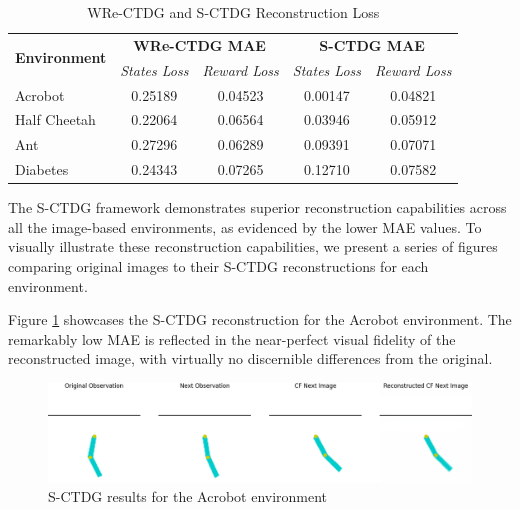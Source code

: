 \begin{table}[h]
    \centering
    \begin{tabular}{@{}lcccc@{}}
    \toprule
    \multicolumn{1}{c}{\multirow{2}{*}{\textbf{Environment}}} & \multicolumn{2}{c}{\textbf{WRe-CTDG MAE}}   & \multicolumn{2}{c}{\textbf{S-CTDG MAE}}     \\ \cmidrule(l){2-5} 
    \multicolumn{1}{c}{}                                      & \textit{States Loss} & \textit{Reward Loss} & \textit{States Loss} & \textit{Reward Loss} \\ \midrule
    Acrobot                                                   & 0.25189              & 0.04523              & 0.00147              & 0.04821              \\
    Half Cheetah                                              & 0.22064              & 0.06564              & 0.03946              & 0.05912              \\
    Ant                                                       & 0.27296              & 0.06289              & 0.09391              & 0.07071              \\
    Diabetes                                                  & 0.24343              & 0.07265              & 0.12710              & 0.07582              \\ \bottomrule
    \end{tabular}
    \caption{WRe-CTDG and S-CTDG Reconstruction Loss}
    \label{tab:mae}
\end{table}

The S-CTDG framework demonstrates superior reconstruction
capabilities across all the image-based environments,
as evidenced by the lower MAE values.
To visually illustrate these reconstruction capabilities, we present a
series of figures comparing original images to their S-CTDG reconstructions
for each environment.

Figure \ref{fig:acrobot_recon} showcases the S-CTDG reconstruction
for the Acrobot environment. The remarkably low MAE
is reflected in the near-perfect visual fidelity of the reconstructed image,
with virtually no discernible differences from the original.

\begin{figure}[h]
    \centering
    \includegraphics[width=\textwidth]{figures/ch5/e2e_acro.png}
    \caption{S-CTDG results for the Acrobot environment}
    \label{fig:acrobot_recon}
\end{figure}

